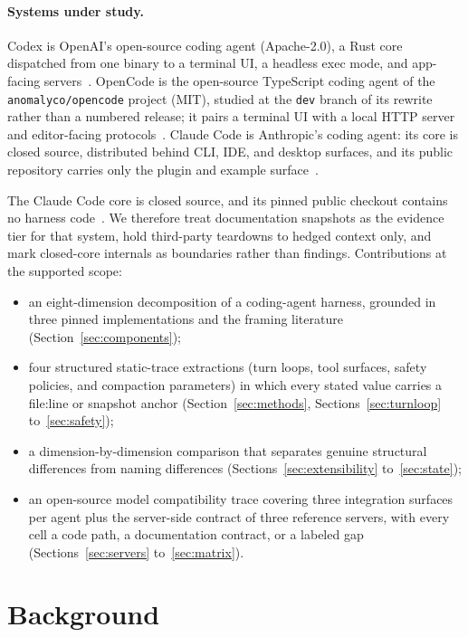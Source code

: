 \documentclass{article}
\newcommand{\codex}[0]{Codex}
\newcommand{\occ}[0]{OpenCode}
\newcommand{\ccc}[0]{Claude Code}
\begin{document}
\paragraph{Systems under study.} \codex{} is OpenAI's open-source coding
agent (Apache-2.0), a Rust core dispatched from one binary to a terminal
UI, a headless exec mode, and app-facing
servers~\citep{codexRepo}. \occ{} is the open-source
TypeScript coding agent of the \texttt{anomalyco/opencode} project (MIT),
studied at the \texttt{dev} branch of its rewrite rather than a numbered
release; it pairs a terminal UI with a local HTTP server and editor-facing
protocols~\citep{opencodeRepo}. \ccc{} is Anthropic's
coding agent: its core is closed source, distributed behind CLI, IDE, and
desktop surfaces, and its public repository carries only the plugin and
example surface~\citep{claudeCodePluginSurface,claudeCodeDocsPermissions}.

The \ccc{} core is closed source, and its pinned public checkout contains no
harness code~\citep{claudeCodePluginSurface}. We therefore treat documentation
snapshots as the evidence tier for that system, hold third-party teardowns
to hedged context only, and mark closed-core internals as boundaries rather
than findings. Contributions at the supported scope:

\begin{itemize}
  \item an eight-dimension decomposition of a coding-agent harness, grounded
  in three pinned implementations and the framing literature
  (Section~\ref{sec:components});
  \item four structured static-trace extractions (turn loops, tool
  surfaces, safety policies, and compaction parameters) in which every
  stated value carries a file:line or snapshot anchor
  (Section~\ref{sec:methods}, Sections~\ref{sec:turnloop} to~\ref{sec:safety});
  \item a dimension-by-dimension comparison that separates genuine
  structural differences from naming differences
  (Sections~\ref{sec:extensibility} to~\ref{sec:state});
  \item an open-source model compatibility trace covering three integration
  surfaces per agent plus the server-side contract of three reference
  servers, with every cell a code path, a documentation contract, or a
  labeled gap (Sections~\ref{sec:servers} to~\ref{sec:matrix}).
\end{itemize}

\section{Background}
\label{sec:background}
\end{document}
